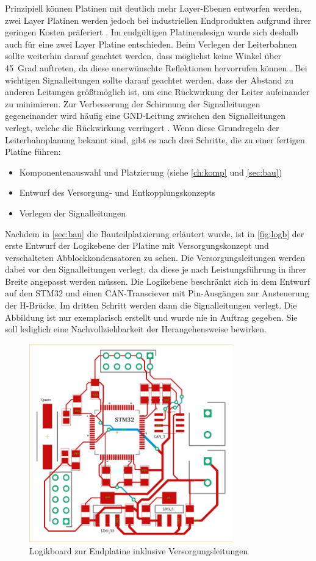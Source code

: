 Prinzipiell können Platinen mit deutlich mehr Layer-Ebenen entworfen werden, zwei Layer Platinen werden jedoch bei industriellen Endprodukten aufgrund ihrer geringen Kosten präferiert \cite[S.13]{emcdes}. Im endgültigen Platinendesign wurde sich deshalb auch für eine zwei Layer Platine entschieden. Beim Verlegen der Leiterbahnen sollte weiterhin darauf geachtet werden, dass möglichst keine Winkel über \SI{45}{Grad} auftreten, da diese unerwünschte Reflektionen hervorrufen können \cite[S.17]{emcdes}. Bei wichtigen Signalleitungen sollte darauf geachtet werden, dass der Abstand zu anderen Leitungen größtmöglich ist, um eine Rückwirkung der Leiter aufeinander zu minimieren. Zur Verbesserung der Schirmung der Signalleitungen gegeneinander wird häufig eine GND-Leitung zwischen den Signalleitungen verlegt, welche die Rückwirkung verringert \cite[S.45]{Franz2012}.
Wenn diese Grundregeln der Leiterbahnplanung bekannt sind, gibt es nach \cite[S.12]{emcdes} drei Schritte, die zu einer fertigen Platine führen:
\begin{itemize}
	\item Komponentenauswahl und Platzierung (siehe \autoref{ch:komp} und \autoref{sec:bau})
	\item Entwurf des Versorgung- und Entkopplungskonzepts
	\item Verlegen der Signalleitungen
\end{itemize}
Nachdem in \autoref{sec:bau} die Bauteilplatzierung erläutert wurde, ist in \autoref{fig:logb} der erste Entwurf der Logikebene der Platine mit Versorgungskonzept und verschalteten Abblockkondensatoren zu sehen. Die Versorgungsleitungen werden dabei vor den Signalleitungen verlegt, da diese je nach Leistungsführung in ihrer Breite angepasst werden müssen. Die Logikebene beschränkt sich in dem Entwurf auf den STM32 und einen CAN-Transciever mit Pin-Ausgängen zur Ansteuerung der H-Brücke. Im dritten Schritt werden dann die Signalleitungen verlegt. Die Abbildung ist nur exemplarisch erstellt und wurde nie in Auftrag gegeben. Sie soll lediglich eine Nachvollziehbarkeit der Herangehensweise bewirken.
\begin{figure}[H]%
\centering
\includegraphics[width=250pt]{./Bilder/logb}%
\caption{Logikboard zur Endplatine inklusive Versorgungsleitungen}%
\label{fig:logb}%
\end{figure}
